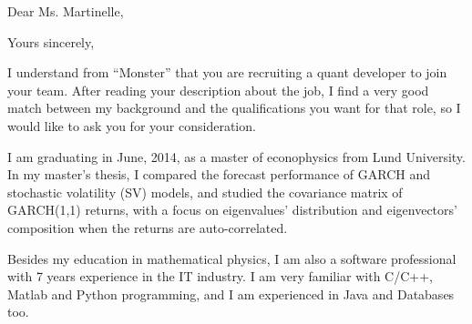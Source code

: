 \documentclass[10pt,a4paper, gentium]{moderncv}        %
\begin{document}
\date{\today}
\opening{Dear Ms. Martinelle,}
\closing{Yours sincerely,}
\makelettertitle

I understand from ``Monster'' that you are recruiting a quant
developer to join your team. After reading your description 
about the job, I find a very good match between my background and the
qualifications you want for that role, so I would like to ask you for
your consideration.



I am graduating in June, 2014, as a master of econophysics
from Lund University. In my master's thesis, I compared the forecast
performance of GARCH and stochastic volatility (SV) models, and
studied the covariance matrix of GARCH(1,1) returns, with a focus on
eigenvalues' distribution and eigenvectors' composition when the
returns are auto-correlated.


Besides my education in mathematical physics, I am also a software
professional with 7 years experience in the IT industry. I am very
familiar with C/C++, Matlab and Python programming, and I am
experienced in Java and Databases too.
\end{document}
